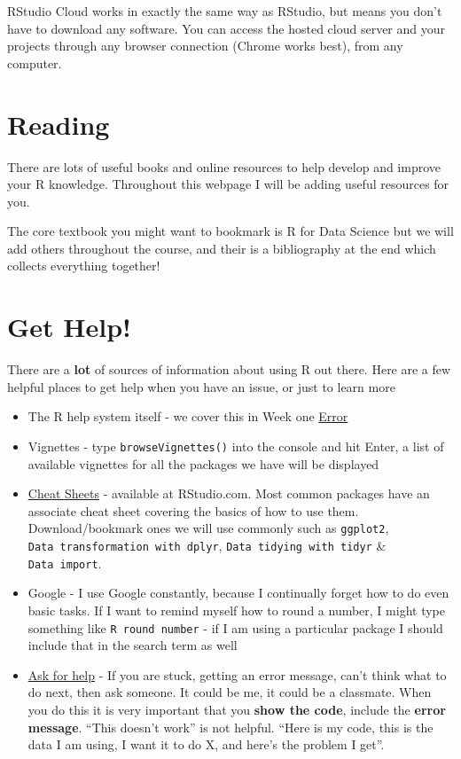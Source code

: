 \documentclass[
]{book}
\begin{document}
RStudio Cloud works in exactly the same way as RStudio, but means you don't have to download any software. You can access the hosted cloud server and your projects through any browser connection (Chrome works best), from any computer.

\hypertarget{reading}{%
\section{Reading}\label{reading}}

There are lots of useful books and online resources to help develop and improve your R knowledge. Throughout this webpage I will be adding useful resources for you.

The core textbook you might want to bookmark is R for Data Science \citep{R4DS} but we will add others throughout the course, and their is a bibliography at the end which collects everything together!

\hypertarget{get-help}{%
\section{Get Help!}\label{get-help}}

There are a \textbf{lot} of sources of information about using R out there.
Here are a few helpful places to get help when you have an issue, or just to learn more

\begin{itemize}
\item
  The R help system itself - we cover this in Week one \protect\hyperlink{error}{Error}
\item
  Vignettes - type \texttt{browseVignettes()} into the console and hit Enter, a list of available vignettes for all the packages we have will be displayed
\item
  \href{https://www.rstudio.com/resources/cheatsheets/}{Cheat Sheets} - available at RStudio.com. Most common packages have an associate cheat sheet covering the basics of how to use them. Download/bookmark ones we will use commonly such as \texttt{ggplot2}, \texttt{Data\ transformation\ with\ dplyr}, \texttt{Data\ tidying\ with\ tidyr} \& \texttt{Data\ import}.
\item
  Google - I use Google constantly, because I continually forget how to do even basic tasks. If I want to remind myself how to round a number, I might type something like \texttt{R\ round\ number} - if I am using a particular package I should include that in the search term as well
\item
  \href{https://web.yammer.com/main/groups/eyJfdHlwZSI6Ikdyb3VwIiwiaWQiOiI3OTAyMTk1NzEyMCJ9/all}{Ask for help} - If you are stuck, getting an error message, can't think what to do next, then ask someone. It could be me, it could be a classmate. When you do this it is very important that you \textbf{show the code}, include the \textbf{error message}. ``This doesn't work'' is not helpful. ``Here is my code, this is the data I am using, I want it to do X, and here's the problem I get''.
\end{itemize}
\end{document}
